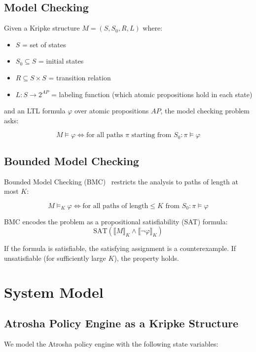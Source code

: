 \documentclass{llncs}
\begin{document}
\subsection{Model Checking}

Given a Kripke structure $M = (S, S_0, R, L)$ where:
\begin{itemize}
    \item $S$ = set of states
    \item $S_0 \subseteq S$ = initial states
    \item $R \subseteq S \times S$ = transition relation
    \item $L: S \rightarrow 2^{AP}$ = labeling function (which atomic propositions hold in each state)
\end{itemize}

and an LTL formula $\varphi$ over atomic propositions $AP$, the model checking problem asks:

$$M \models \varphi \iff \text{for all paths } \pi \text{ starting from } S_0: \pi \models \varphi$$

\subsection{Bounded Model Checking}

Bounded Model Checking (BMC)~\cite{biere2003} restricts the analysis to paths of length at most $K$:

$$M \models_K \varphi \iff \text{for all paths of length} \leq K \text{ from } S_0: \pi \models \varphi$$

BMC encodes the problem as a propositional satisfiability (SAT) formula:
$$\text{SAT}(\llbracket M \rrbracket_K \wedge \llbracket \neg\varphi \rrbracket_K)$$

If the formula is satisfiable, the satisfying assignment is a counterexample. If unsatisfiable (for sufficiently large $K$), the property holds.

\section{System Model}

\subsection{Atrosha Policy Engine as a Kripke Structure}

We model the Atrosha policy engine with the following state variables:
\end{document}
